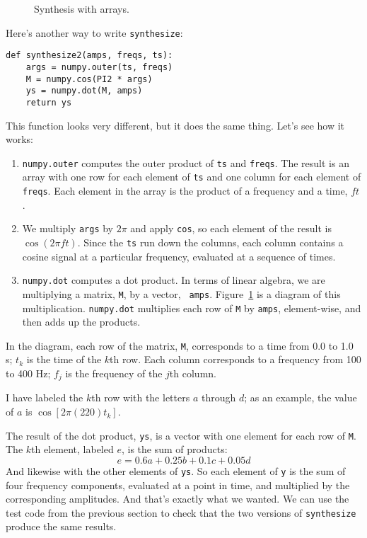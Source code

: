 \documentclass[12pt]{book}
\begin{document}
\begin{figure}

\caption{Synthesis with arrays.}
\label{fig.synthesis}
\end{figure}

Here's another way to write {\tt synthesize}:

\begin{verbatim}
def synthesize2(amps, freqs, ts):
    args = numpy.outer(ts, freqs)
    M = numpy.cos(PI2 * args)
    ys = numpy.dot(M, amps)
    return ys
\end{verbatim}

This function looks very different, but it does the same thing.
Let's see how it works:

\begin{enumerate}

\item {\tt numpy.outer} computes the outer product of {\tt ts} and
  {\tt freqs}.  The result is an array with one row for each element
  of {\tt ts} and one column for each element of {\tt freqs}.  Each
  element in the array is the product of a frequency and a time, $f
  t$.

\item We multiply {\tt args} by $2 \pi$ and apply {\tt cos}, so each
  element of the result is $\cos (2 \pi f t)$.  Since the {\tt ts} run
  down the columns, each column contains a cosine signal at a
  particular frequency, evaluated at a sequence of times.

\item {\tt numpy.dot} computes a dot product.  In terms of linear
  algebra, we are multiplying a matrix, {\tt M}, by a vector, {\tt
    amps}.  Figure~\ref{fig.synthesis} is a diagram of this
  multiplication.  {\tt numpy.dot} multiplies each row of {\tt M} by
  {\tt amps}, element-wise, and then adds up the products.

\end{enumerate}

In the diagram, each row of the matrix, {\tt M}, corresponds to a time 
from 0.0 to 1.0 s; $t_k$ is the time of the $k$th row.
Each column corresponds to a frequency from
100 to 400 Hz; $f_j$ is the frequency of the $j$th column.

I have labeled the $k$th row with the letters $a$ through $d$; as an
example, the value of $a$ is $\cos [2 \pi (220) t_k]$.

The result of the dot product, {\tt ys}, is a vector with one element
for each row of {\tt M}.  The $k$th element, labeled $e$, is the sum
of products:
%
\[ e = 0.6 a + 0.25 b + 0.1 c + 0.05 d \]
%
And likewise with the other elements of {\tt ys}.  So each element
of {\tt y} is the sum of four frequency components, evaluated at
a point in time, and multiplied by the corresponding amplitudes.
And that's exactly what we wanted.  We can use the test code from
the previous section to
check that the two versions of {\tt synthesize} produce the same results.
\end{document}

